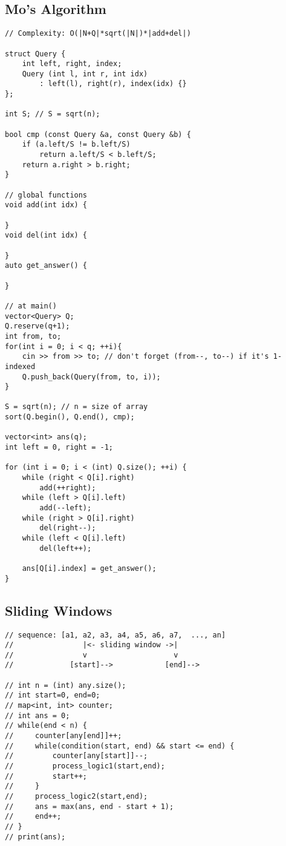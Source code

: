 \documentclass[10pt,letterpaper,twocolumn,twosided]{article}
\begin{document}
\subsection{Mo's Algorithm}
\begin{lstlisting}
// Complexity: O(|N+Q|*sqrt(|N|)*|add+del|)

struct Query {
    int left, right, index;
    Query (int l, int r, int idx)
        : left(l), right(r), index(idx) {}
};

int S; // S = sqrt(n);

bool cmp (const Query &a, const Query &b) {
    if (a.left/S != b.left/S)
        return a.left/S < b.left/S;
    return a.right > b.right;
}

// global functions
void add(int idx) {

}
void del(int idx) {

}
auto get_answer() {

}

// at main()
vector<Query> Q;
Q.reserve(q+1);
int from, to;
for(int i = 0; i < q; ++i){
    cin >> from >> to; // don't forget (from--, to--) if it's 1-indexed
    Q.push_back(Query(from, to, i));
}

S = sqrt(n); // n = size of array
sort(Q.begin(), Q.end(), cmp);

vector<int> ans(q);
int left = 0, right = -1;

for (int i = 0; i < (int) Q.size(); ++i) {
    while (right < Q[i].right)
        add(++right);
    while (left > Q[i].left)
        add(--left);
    while (right > Q[i].right)
        del(right--);
    while (left < Q[i].left)
        del(left++);
    
    ans[Q[i].index] = get_answer();
}
\end{lstlisting}

\subsection{Sliding Windows}
\begin{lstlisting}
// sequence: [a1, a2, a3, a4, a5, a6, a7,  ..., an]
//                |<- sliding window ->|
//                v                    v 
//             [start]-->            [end]-->

// int n = (int) any.size();
// int start=0, end=0;
// map<int, int> counter;
// int ans = 0;
// while(end < n) {
//     counter[any[end]]++;
//     while(condition(start, end) && start <= end) {
//         counter[any[start]]--;
//         process_logic1(start,end);
//         start++;
//     }
//     process_logic2(start,end);
//     ans = max(ans, end - start + 1);
//     end++;
// }
// print(ans);
\end{lstlisting}
\end{document}

